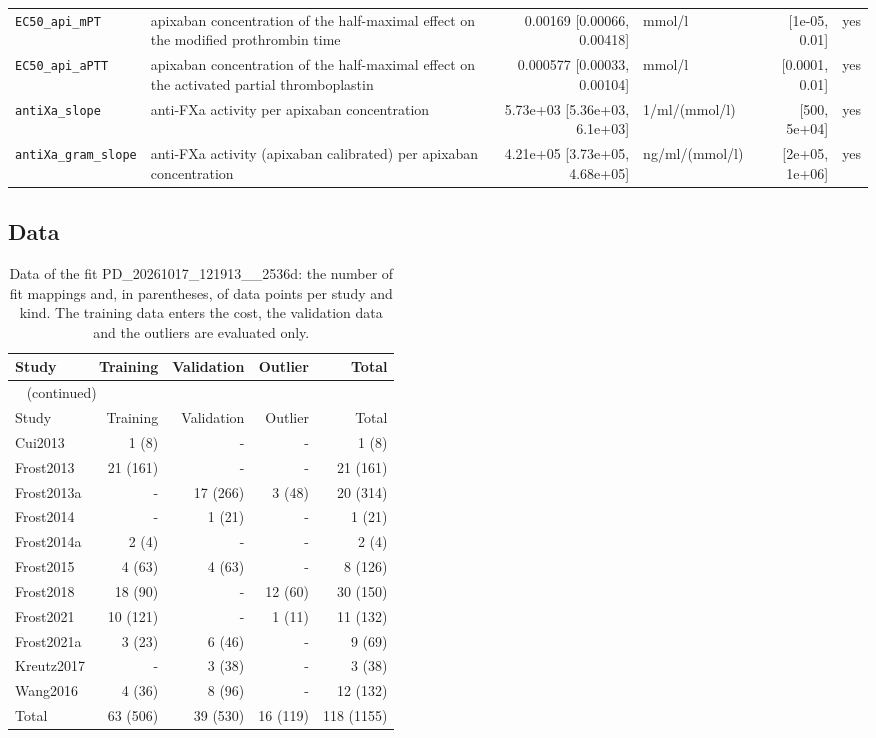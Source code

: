 \documentclass{article}
\begin{document}
\begin{longtable}{llrlrl}
\texttt{EC50\_api\_mPT} & apixaban concentration of the half-maximal effect on the modified prothrombin time & 0.00169 [0.00066, 0.00418] & mmol/l & [1e-05, 0.01] & yes \\
\texttt{EC50\_api\_aPTT} & apixaban concentration of the half-maximal effect on the activated partial thromboplastin & 0.000577 [0.00033, 0.00104] & mmol/l & [0.0001, 0.01] & yes \\
\texttt{antiXa\_slope} & anti-FXa activity per apixaban concentration & 5.73e+03 [5.36e+03, 6.1e+03] & 1/ml/(mmol/l) & [500, 5e+04] & yes \\
\texttt{antiXa\_gram\_slope} & anti-FXa activity (apixaban calibrated) per apixaban concentration & 4.21e+05 [3.73e+05, 4.68e+05] & ng/ml/(mmol/l) & [2e+05, 1e+06] & yes \\
\end{longtable}

\subsection{Data}

\begin{longtable}{lrrrr}
\caption{Data of the fit PD\_20261017\_121913\_\_2536d: the number of fit mappings and, in parentheses, of data points per study and kind. The training data enters the cost, the validation data and the outliers are evaluated only.}\label{tab:data:PD_20261017_121913__2536d} \\
\toprule
Study & Training & Validation & Outlier & Total \\
\midrule
\endfirsthead
\multicolumn{5}{l}{\small\tablename~\thetable{} (continued)} \\
\toprule
Study & Training & Validation & Outlier & Total \\
\midrule
\endhead
\bottomrule
\endlastfoot
Cui2013 & 1 (8) & - & - & 1 (8) \\
Frost2013 & 21 (161) & - & - & 21 (161) \\
Frost2013a & - & 17 (266) & 3 (48) & 20 (314) \\
Frost2014 & - & 1 (21) & - & 1 (21) \\
Frost2014a & 2 (4) & - & - & 2 (4) \\
Frost2015 & 4 (63) & 4 (63) & - & 8 (126) \\
Frost2018 & 18 (90) & - & 12 (60) & 30 (150) \\
Frost2021 & 10 (121) & - & 1 (11) & 11 (132) \\
Frost2021a & 3 (23) & 6 (46) & - & 9 (69) \\
Kreutz2017 & - & 3 (38) & - & 3 (38) \\
Wang2016 & 4 (36) & 8 (96) & - & 12 (132) \\
Total & 63 (506) & 39 (530) & 16 (119) & 118 (1155) \\
\end{longtable}
\end{document}
